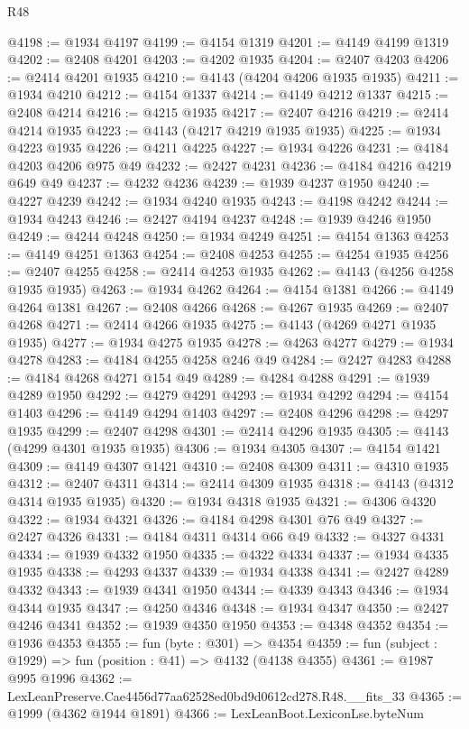 \begin{lexlean}{R48}
\begin{coremodule}
@4198 := @1934 @4197
@4199 := @4154 @1319
@4201 := @4149 @4199 @1319
@4202 := @2408 @4201
@4203 := @4202 @1935
@4204 := @2407 @4203
@4206 := @2414 @4201 @1935
@4210 := @4143 (@4204 @4206 @1935 @1935)
@4211 := @1934 @4210
@4212 := @4154 @1337
@4214 := @4149 @4212 @1337
@4215 := @2408 @4214
@4216 := @4215 @1935
@4217 := @2407 @4216
@4219 := @2414 @4214 @1935
@4223 := @4143 (@4217 @4219 @1935 @1935)
@4225 := @1934 @4223 @1935
@4226 := @4211 @4225
@4227 := @1934 @4226
@4231 := @4184 @4203 @4206 @975 @49
@4232 := @2427 @4231
@4236 := @4184 @4216 @4219 @649 @49
@4237 := @4232 @4236
@4239 := @1939 @4237 @1950
@4240 := @4227 @4239
@4242 := @1934 @4240 @1935
@4243 := @4198 @4242
@4244 := @1934 @4243
@4246 := @2427 @4194 @4237
@4248 := @1939 @4246 @1950
@4249 := @4244 @4248
@4250 := @1934 @4249
@4251 := @4154 @1363
@4253 := @4149 @4251 @1363
@4254 := @2408 @4253
@4255 := @4254 @1935
@4256 := @2407 @4255
@4258 := @2414 @4253 @1935
@4262 := @4143 (@4256 @4258 @1935 @1935)
@4263 := @1934 @4262
@4264 := @4154 @1381
@4266 := @4149 @4264 @1381
@4267 := @2408 @4266
@4268 := @4267 @1935
@4269 := @2407 @4268
@4271 := @2414 @4266 @1935
@4275 := @4143 (@4269 @4271 @1935 @1935)
@4277 := @1934 @4275 @1935
@4278 := @4263 @4277
@4279 := @1934 @4278
@4283 := @4184 @4255 @4258 @246 @49
@4284 := @2427 @4283
@4288 := @4184 @4268 @4271 @154 @49
@4289 := @4284 @4288
@4291 := @1939 @4289 @1950
@4292 := @4279 @4291
@4293 := @1934 @4292
@4294 := @4154 @1403
@4296 := @4149 @4294 @1403
@4297 := @2408 @4296
@4298 := @4297 @1935
@4299 := @2407 @4298
@4301 := @2414 @4296 @1935
@4305 := @4143 (@4299 @4301 @1935 @1935)
@4306 := @1934 @4305
@4307 := @4154 @1421
@4309 := @4149 @4307 @1421
@4310 := @2408 @4309
@4311 := @4310 @1935
@4312 := @2407 @4311
@4314 := @2414 @4309 @1935
@4318 := @4143 (@4312 @4314 @1935 @1935)
@4320 := @1934 @4318 @1935
@4321 := @4306 @4320
@4322 := @1934 @4321
@4326 := @4184 @4298 @4301 @76 @49
@4327 := @2427 @4326
@4331 := @4184 @4311 @4314 @66 @49
@4332 := @4327 @4331
@4334 := @1939 @4332 @1950
@4335 := @4322 @4334
@4337 := @1934 @4335 @1935
@4338 := @4293 @4337
@4339 := @1934 @4338
@4341 := @2427 @4289 @4332
@4343 := @1939 @4341 @1950
@4344 := @4339 @4343
@4346 := @1934 @4344 @1935
@4347 := @4250 @4346
@4348 := @1934 @4347
@4350 := @2427 @4246 @4341
@4352 := @1939 @4350 @1950
@4353 := @4348 @4352
@4354 := @1936 @4353
@4355 := fun (byte : @301) => @4354
@4359 := fun (subject : @1929) => fun (position : @41) => @4132 (@4138 @4355)
@4361 := @1987 @995 @1996
@4362 := LexLeanPreserve.Cae4456d77aa62528ed0bd9d0612cd278.R48.__fits_33
@4365 := @1999 (@4362 @1944 @1891)
@4366 := LexLeanBoot.LexiconLse.byteNum

\end{coremodule}
\end{lexlean}
